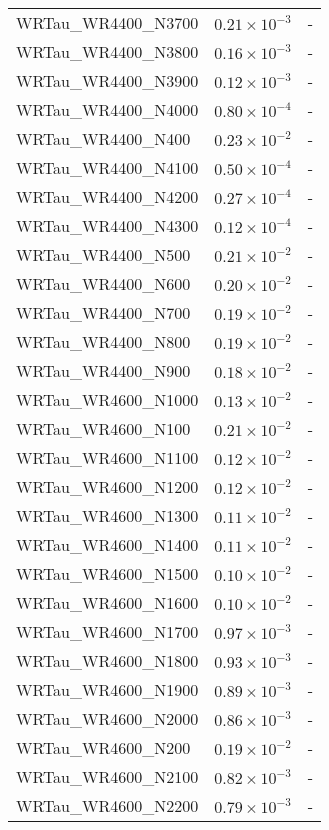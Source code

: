 \begin{longtable}[c]{| C{.35\textwidth} | C{.15\textwidth} | C{.1\textwidth}|}
    WRTau\_WR4400\_N3700 & $0.21\times10^{-3}$ & - \\
    WRTau\_WR4400\_N3800 & $0.16\times10^{-3}$ & - \\
    WRTau\_WR4400\_N3900 & $0.12\times10^{-3}$ & - \\
    WRTau\_WR4400\_N4000 & $0.80\times10^{-4}$ & - \\
    WRTau\_WR4400\_N400 & $0.23\times10^{-2}$ & - \\
    WRTau\_WR4400\_N4100 & $0.50\times10^{-4}$ & - \\
    WRTau\_WR4400\_N4200 & $0.27\times10^{-4}$ & - \\
    WRTau\_WR4400\_N4300 & $0.12\times10^{-4}$ & - \\
    WRTau\_WR4400\_N500 & $0.21\times10^{-2}$ & - \\
    WRTau\_WR4400\_N600 & $0.20\times10^{-2}$ & - \\
    WRTau\_WR4400\_N700 & $0.19\times10^{-2}$ & - \\
    WRTau\_WR4400\_N800 & $0.19\times10^{-2}$ & - \\
    WRTau\_WR4400\_N900 & $0.18\times10^{-2}$ & - \\
    WRTau\_WR4600\_N1000 & $0.13\times10^{-2}$ & - \\
    WRTau\_WR4600\_N100 & $0.21\times10^{-2}$ & - \\
    WRTau\_WR4600\_N1100 & $0.12\times10^{-2}$ & - \\
    WRTau\_WR4600\_N1200 & $0.12\times10^{-2}$ & - \\
    WRTau\_WR4600\_N1300 & $0.11\times10^{-2}$ & - \\
    WRTau\_WR4600\_N1400 & $0.11\times10^{-2}$ & - \\
    WRTau\_WR4600\_N1500 & $0.10\times10^{-2}$ & - \\
    WRTau\_WR4600\_N1600 & $0.10\times10^{-2}$ & - \\
    WRTau\_WR4600\_N1700 & $0.97\times10^{-3}$ & - \\
    WRTau\_WR4600\_N1800 & $0.93\times10^{-3}$ & - \\
    WRTau\_WR4600\_N1900 & $0.89\times10^{-3}$ & - \\
    WRTau\_WR4600\_N2000 & $0.86\times10^{-3}$ & - \\
    WRTau\_WR4600\_N200 & $0.19\times10^{-2}$ & - \\
    WRTau\_WR4600\_N2100 & $0.82\times10^{-3}$ & - \\
    WRTau\_WR4600\_N2200 & $0.79\times10^{-3}$ & - \\

\end{longtable}
